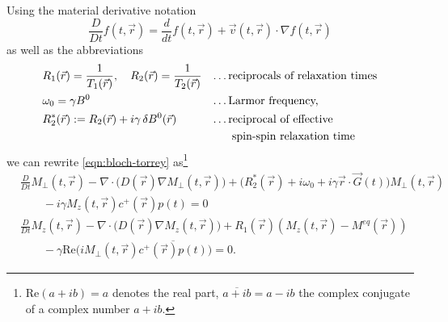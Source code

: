 \documentclass{ws-m3as}
\renewcommand\Re{\mathrm{Re}}
\begin{document}
Using the material derivative notation
\[
\frac{D}{Dt} f(t, \vec r) =\frac{d}{dt} f(t, \vec r) + \vec v(t,\vec r)\cdot\nabla f(t,\vec r)
\]
as well as the abbreviations 
\begin{equation}\label{R2star}
\begin{aligned}
&R_1(\vec r)=\frac{1}{T_1(\vec r)}, \quad R_2(\vec r)=\frac{1}{T_2(\vec r)}&&\text{\ldots reciprocals of relaxation times}\\
&\omega_0=\gamma B^0 &&\text{\ldots Larmor frequency, }\\
&R_2^*(\vec r):=R_2(\vec r)+i\gamma\,\delta B^0 (\vec r) 
&&\text{\ldots reciprocal of effective}\\ 
&&&\text{\phantom{\ldots} spin-spin relaxation time }
\end{aligned}
\end{equation}
we can rewrite \eqref{eqn:bloch-torrey} as\footnote{$\Re(a+ib)=a$ denotes the real part, $\overline{a+ib}=a-ib$ the complex conjugate of a complex number $a+ib$.}
\begin{equation}\label{eqn:bloch-torrey-complex}
\begin{aligned}
&\frac{D}{Dt}M_\perp(t, \vec r) -\nabla\cdot\bigl(D(\vec r) \nabla M_\perp(t, \vec r)\bigr) +\bigl(R_2^*(\vec r)+i\omega_0  + i\gamma\vec r \cdot \vec G(t)\bigr)M_\perp(t, \vec r)\\
&\qquad-i\gamma M_z(t, \vec r)c^+(\vec r)p(t)=0\\    
&\frac{D}{Dt}M_z(t, \vec r) -\nabla\cdot\bigl(D(\vec r) \nabla M_z(t, \vec r)\bigr) +R_1(\vec r) (M_z(t, \vec r)-M^{eq}(\vec r))
\\
&\qquad-\gamma\Re\bigl(iM_\perp(t, \vec r)\overline{c^+(\vec r)p(t)}\bigr)=0.
\end{aligned}
\end{equation}
\end{document}
